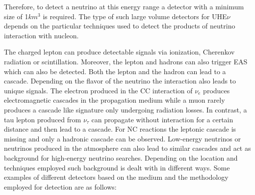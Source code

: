 Therefore, to detect a neutrino at this energy range a detector with a minimum size of 1$km^3$ is required. The type of such large volume detectors for UHE$\nu$ depends on the particular techniques used to detect the products of neutrino interaction with nucleon. 


The charged lepton can produce detectable signals via ionization, Cherenkov radiation or scintillation. Moreover, the lepton and hadrons can also trigger EAS which can also be detected. Both the lepton and the hadron can lead to a cascade. Depending on the flavor of the neutrino the interaction also leads to unique signals. The electron produced in the CC interaction of $\nu_e$ produces electromagnetic cascades in the propagation medium while a muon rarely produces a cascade like signature only undergoing radiation losses. In contrast, a tau lepton produced from $\nu_{\tau}$ can propagate without interaction for a certain distance and then lead to a cascade. For NC reactions the leptonic cascade is missing and only a hadronic cascade can be observed. Low-energy neutrinos or neutrinos produced in the atmosphere can also lead to similar cascades and act as background for high-energy neutrino searches. Depending on the location and techniques employed such background is dealt with in different ways. Some examples of different detectors based on the medium and the methodology employed for detection are as follows:

